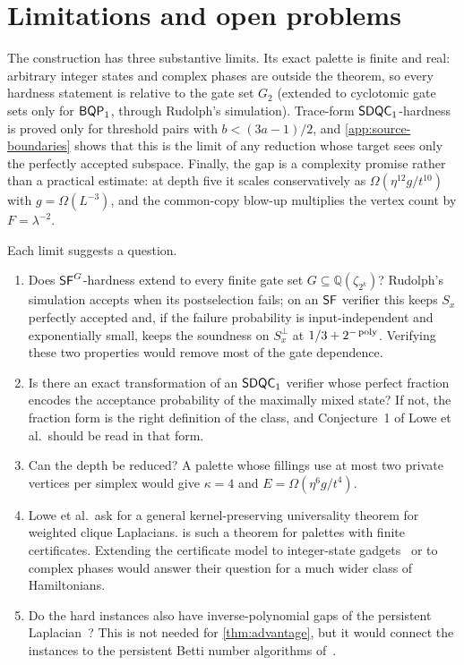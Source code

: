 \section{Limitations and open problems}
\label{sec:limitations}

The construction has three substantive limits.  Its exact palette is finite
and real: arbitrary integer states and complex phases are outside the
theorem, so every hardness statement is relative to the gate set \(G_2\)
(extended to cyclotomic gate sets only for \(\mathsf{BQP}_{1}\), through Rudolph's
simulation).  Trace-form \(\mathsf{SDQC}_{1}\)-hardness is proved only for threshold
pairs with \(b<(3a-1)/2\), and \cref{app:source-boundaries} shows that this
is the limit of any reduction whose target sees only the perfectly accepted
subspace.  Finally, the gap is a complexity promise rather than a practical
estimate: at depth five it scales conservatively as
\(\Omega(\eta^{12}g/t^{10})\) with \(g=\Omega(L^{-3})\), and the common-copy
blow-up multiplies the vertex count by \(F=\lambda^{-2}\).

Each limit suggests a question.
\begin{enumerate}
\item Does \(\mathsf{SF}^{G}\)-hardness extend to every finite gate set
\(G\subseteq\mathbb Q(\zeta_{2^k})\)?  Rudolph's simulation accepts when its
postselection fails; on an \(\mathsf{SF}\) verifier this keeps \(S_x\) perfectly
accepted and, if the failure probability is input-independent and
exponentially small, keeps the soundness on \(S_x^\perp\) at
\(1/3+2^{-\operatorname{poly}}\).  Verifying these two properties would remove most of the
gate dependence.
\item Is there an exact transformation of an \(\mathsf{SDQC}_{1}\) verifier whose
perfect fraction encodes the acceptance probability of the maximally mixed
state?  If not, the fraction form is the right definition of the class, and
Conjecture~1 of Lowe et al.\ should be read in that form.
\item Can the depth be reduced?  A palette whose fillings use at most two
private vertices per simplex would give \(\kappa=4\) and
\(E=\Omega(\eta^6g/t^4)\).
\item Lowe et al.\ ask for a general kernel-preserving universality theorem
for weighted clique Laplacians.   is such a theorem for
palettes with finite certificates.  Extending the certificate model to
integer-state gadgets~\cite{king2026gapped} or to complex phases would answer
their question for a much wider class of Hamiltonians.
\item Do the hard instances also have inverse-polynomial gaps of the
persistent Laplacian~\cite{memoli2022persistent}?  This is not needed for
\cref{thm:advantage}, but it would connect the instances to the persistent
Betti number algorithms of~\cite{hayakawa2022quantum,mcardle2026streamlined}.
\end{enumerate}

